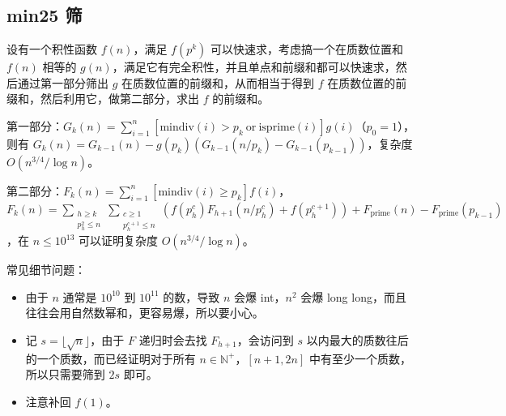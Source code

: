 \documentclass[10pt]{ctexart}
\providecommand{\tightlist}{\setlength{\itemsep}{0pt}\setlength{\parskip}{0pt}}
\begin{document}
\begin{multicols}{3}
    \subsection{min25 筛}\label{min25-ux7b5b}

    设有一个积性函数 \(f(n)\)，满足 \(f(p^k)\)
    可以快速求，考虑搞一个在质数位置和 \(f(n)\) 相等的
    \(g(n)\)，满足它有完全积性，并且单点和前缀和都可以快速求，然后通过第一部分筛出
    \(g\) 在质数位置的前缀和，从而相当于得到 \(f\)
    在质数位置的前缀和，然后利用它，做第二部分，求出 \(f\) 的前缀和。

    第一部分：\(G_k(n)=\sum_{i=1}^{n}[\text{mindiv}(i)>p_k{~\text{or}~}\text{isprime}(i)]g(i)\)（\(p_0=1\)），则有
    \(G_k(n)=G_{k-1}(n)-g(p_k)(G_{k-1}(n/p_k)-G_{k-1}(p_{k-1}))\)，复杂度
    \(O({n^{3/4}}/{\log n})\)。

    第二部分：\(F_k(n)=\sum_{i=1}^{n}[\text{mindiv}(i)\ge p_k]f(i)\)，\(F_k(n)=\sum_{\substack{h\ge k\\ p_h^2\le n}}\sum_{\substack{c\ge 1\\ p_h^{c+1}\le n}}(f(p_h^c)F_{h+1}(n/p_h^c)+f(p_h^{c+1}))+F_{\text{prime}}(n)-F_{\text{prime}}(p_{k-1})\)，在
    \(n\le 10^{13}\) 可以证明复杂度 \(O(n^{3/4}/\log n)\)。

    常见细节问题：

    \begin{itemize}
    \tightlist
    \item
      由于 \(n\) 通常是 \(10^{10}\) 到 \(10^{11}\) 的数，导致 \(n\) 会爆
      int，\(n^2\) 会爆 long
      long，而且往往会用自然数幂和，更容易爆，所以要小心。
    \item
      记 \(s=\lfloor \sqrt{n}\rfloor\)，由于 \(F\) 递归时会去找
      \(F_{h+1}\)，会访问到 \(s\)
      以内最大的质数往后的一个质数，而已经证明对于所有
      \(n\in\mathbb{N}^+\)，\([n+1,2n]\)
      中有至少一个质数，所以只需要筛到 \(2s\) 即可。
    \item
      注意补回 \(f(1)\)。
    \end{itemize}


\end{multicols}
\end{document}
